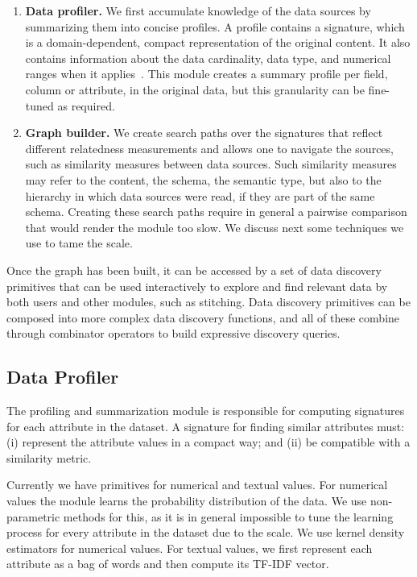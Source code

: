 \begin{enumerate}
\item {\bf Data profiler.} We first accumulate knowledge of the data sources by
summarizing them into concise profiles. A profile contains a signature, which is
a domain-dependent, compact representation of the original content. It also
contains information about the data cardinality, data type, and numerical ranges
when it applies~\cite{profiling_survey}. This module creates a summary profile per field, \ie column or
attribute, in the original data, but this granularity can be fine-tuned as
required.
\item {\bf Graph builder.} We create search paths over the signatures that
reflect different relatedness measurements and allows one to navigate the
sources, such as similarity measures between data sources. Such similarity
measures may refer to the content, the schema, the semantic type, but also to
the hierarchy in which data sources were read, \ie if they are part of the same
schema. Creating these search paths require in general a pairwise comparison
that would render the module too slow.  We discuss next some techniques we use
to tame the scale.  
\end{enumerate}

Once the graph has been built, it can be accessed by a set of data
discovery primitives that can be used interactively to explore and find relevant
data by both users and other modules, such as stitching. Data discovery primitives can be composed
into more complex data discovery functions, and all of these combine through
combinator operators to build expressive discovery queries.  

\subsection{Data Profiler}

The profiling and summarization module is responsible for computing signatures
for each attribute in the dataset. A signature for finding similar attributes
must: (i) represent the attribute values in a compact way; and (ii) be
compatible with a similarity metric. 

Currently we have primitives for numerical and textual values. For numerical
values the module learns the probability distribution of the data. We use
non-parametric methods for this, as it is in general impossible to tune the
learning process for every attribute in the dataset due to the scale. We use
kernel density estimators for numerical values.  For textual values, we first
represent each attribute as a bag of words and then compute its TF-IDF vector.

